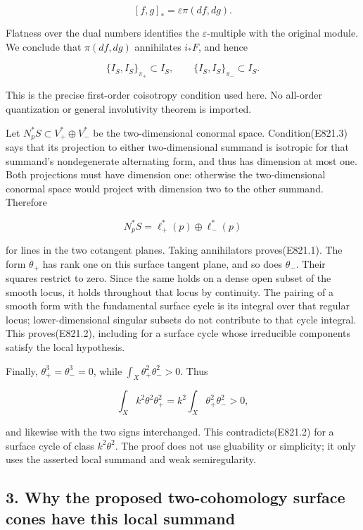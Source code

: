 \[
 [f,g]_* =\varepsilon\pi(df,dg).
\]

Flatness over the dual numbers identifies the \(\varepsilon\)-multiple
with the original module. We conclude that \(\pi(df,dg)\) annihilates
\(i_*F\), and hence

\[
 \{I_S,I_S\}_{\pi_+}\subset I_S,
 \qquad \{I_S,I_S\}_{\pi_-}\subset I_S.
 \tag{E821.3}
\]

This is the precise first-order coisotropy condition used here. No
all-order quantization or general involutivity theorem is imported.

Let \(N_p^*S\subset V_+^*\oplus V_-^*\) be the two-dimensional conormal
space. Condition(E821.3) says that its projection to either
two-dimensional summand is isotropic for that summand's nondegenerate
alternating form, and thus has dimension at most one. Both projections
must have dimension one: otherwise the two-dimensional conormal space
would project with dimension two to the other summand. Therefore

\[
 N_p^*S=\ell_+^*(p)\oplus\ell_-^*(p)
\]

for lines in the two cotangent planes. Taking annihilators
proves(E821.1). The form \(\theta_+\) has rank one on this surface
tangent plane, and so does \(\theta_-\). Their squares restrict to zero.
Since the same holds on a dense open subset of the smooth locus, it
holds throughout that locus by continuity. The pairing of a smooth form
with the fundamental surface cycle is its integral over that regular
locus; lower-dimensional singular subsets do not contribute to that
cycle integral. This proves(E821.2), including for a surface cycle whose
irreducible components satisfy the local hypothesis.

Finally, \(\theta_+^3=\theta_-^3=0\), while
\(\int_X\theta_+^2\theta_-^2>0\). Thus

\[
 \int_X k^2\theta^2\theta_+^2
   =k^2\int_X\theta_+^2\theta_-^2>0,
\]

and likewise with the two signs interchanged. This contradicts(E821.2)
for a surface cycle of class \(k^2\theta^2\). The proof does not use
gluability or simplicity; it only uses the asserted local summand and
weak semiregularity.

\subsection{3. Why the proposed two-cohomology surface cones have this
local
summand}\label{SF-E821-why-the-proposed-two-cohomology-surface-cones-have-this-local-summand}


